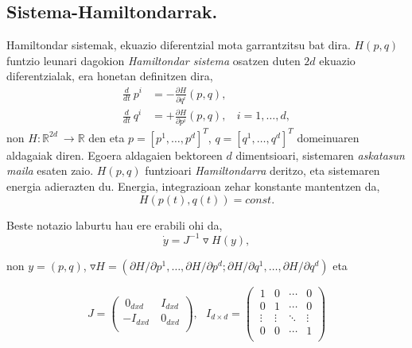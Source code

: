  

\subsection{Sistema-Hamiltondarrak.}

 
Hamiltondar sistemak, ekuazio diferentzial mota garrantzitsu bat dira. $H(p,q)$ funtzio leunari dagokion \emph{Hamiltondar sistema} osatzen duten $2d$ ekuazio diferentzialak, era honetan definitzen dira,
\begin{align*}
\label{eq:212}
\frac{d}{dt} \ {p}^i & =-\frac{\partial H }{\partial q^i} (p,q), \\
\frac{d}{dt} \ {q}^i & =+\frac{\partial H}{\partial p^i} (p,q), \ \ \ \ i=1,\dots,d,
\end{align*}
non $H: {\mathbb{R}}^{2d} \ \longrightarrow {\mathbb{R}}$  den eta  $p=[p^1, \dots , p^d]^T$, $q=[q^1, \dots , q^d]^T$ domeinuaren aldagaiak diren. Egoera aldagaien bektoreen $d$ dimentsioari, sistemaren \emph{askatasun maila} esaten zaio. $H(p,q)$ funtzioari \emph{Hamiltondarra} deritzo, eta sistemaren energia adierazten du. Energia, integrazioan zehar konstante mantentzen da,
\begin{equation*}
\label{eq:212b}
H(p(t),q(t))=const.
\end{equation*}

Beste notazio laburtu hau ere erabili ohi da,
\begin{equation*}
 \label{eq:213}
\dot{y}=J^{-1}\triangledown H(y),
\end{equation*}

non $y=(p,q)$, $\triangledown H=(\partial H/\partial p^1,\dots,\partial H/\partial p^d; \partial H/\partial q^1,\dots,\partial H/\partial q^d)$ eta

\begin{equation*}
 J=\left(\begin{array}{cc}
   \ 0_{dxd} & \ I_{dxd} \\
    -I_{dxd} & \ 0_{dxd} \\
\end{array}\right), \ \ \ 
I_{d \times d}=\left(\begin{array}{cccc}
   \ 1       & 0      & \cdots & 0 \\
   \ 0       & 1      & \cdots & 0 \\
   \ \vdots  & \vdots & \ddots & \vdots \\
   \ 0       & 0 & \cdots & 1 \\
\end{array}\right)  
\end{equation*}



